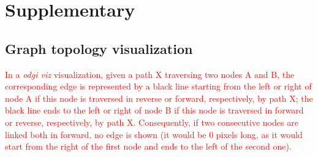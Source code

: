 \documentclass{bioinfo}
\newcommand{\REVIEWED}[1]{{\textcolor{Red}{#1}}}
\newcommand{\beginsupplement}{%
	\setcounter{table}{0}
	\renewcommand{\thetable}{S\arabic{table}}%
	\setcounter{figure}{0}
	\renewcommand{\thefigure}{S\arabic{figure}}%
}
\begin{document}








\clearpage
\beginsupplement

\section{Supplementary}

\subsection{Graph topology visualization}
\label{sec:supp_visualization}
\REVIEWED{In a \textit{odgi viz} visualization, given a path X traversing two nodes A and B, the corresponding edge is represented by a black line starting from the left or right of node A if this node is traversed in reverse or forward, respectively, by path X;
the black line ends to the left or right of node B if this node is traversed in forward or reverse, respectively, by path X.
Consequently, if two consecutive nodes are linked both in forward, no edge is shown (it would be 0 pixels long, as it would start from the right of the first node and ends to the left of the second one).}
\end{document}
